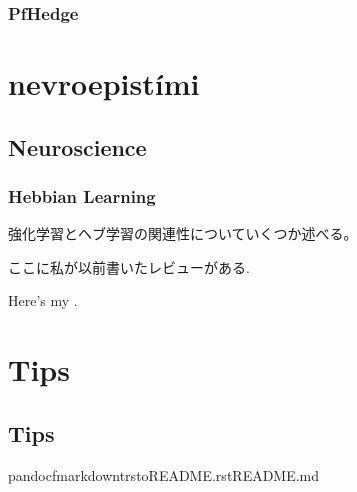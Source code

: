 \documentclass[letterpaper,10pt,english]{sphinxmanual}
\begin{document}
\subsection{PfHedge}
\label{\detokenize{src/deephedge/index:pfhedge}}

\chapter{nevroepistími}
\label{\detokenize{index:nevroepistimi}}
\sphinxstepscope


\section{Neuroscience}
\label{\detokenize{src/neuroscience/index:neuroscience}}\label{\detokenize{src/neuroscience/index::doc}}
\sphinxstepscope


\subsection{Hebbian Learning}
\label{\detokenize{src/neuroscience/hebb:hebbian-learning}}\label{\detokenize{src/neuroscience/hebb::doc}}
\sphinxAtStartPar
強化学習とヘブ学習の関連性についていくつか述べる。

\sphinxAtStartPar
ここに私が以前書いたレビューがある.

\label{\detokenize{src/neuroscience/hebb:pdf-link}}
\sphinxAtStartPar
Here’s my .


\chapter{Tips}
\label{\detokenize{index:tips}}
\sphinxstepscope


\section{Tips}
\label{\detokenize{src/Tips/index:tips}}\label{\detokenize{src/Tips/index::doc}}
\sphinxAtStartPar
{}
\def\sphinxLiteralBlockLabel{\label{\detokenize{src/Tips/index:id1}}}
\begin{sphinxVerbatim}[commandchars=\\\{\},numbers=left,firstnumber=1,stepnumber=1]
pandoc\PYGZhy{}fmarkdown\PYGZhy{}trst\PYGZhy{}oREADME.rstREADME.md
\end{sphinxVerbatim}
\end{document}
